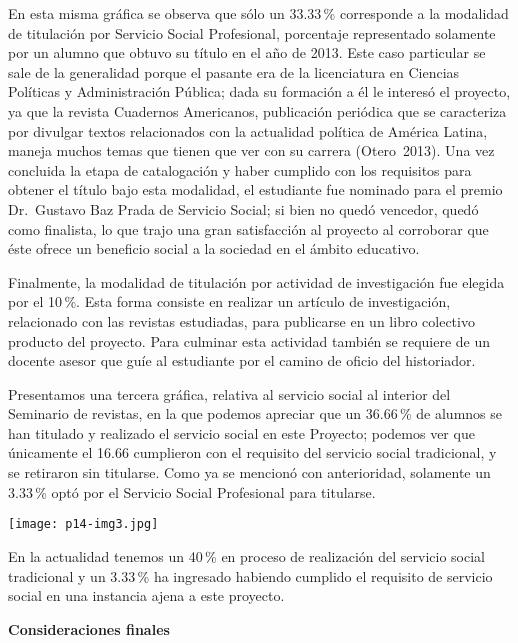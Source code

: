 En esta misma gráfica se observa que sólo un 33.33\,\% corresponde a la
modalidad de titulación por Servicio Social Profesional, porcentaje
representado solamente por un alumno que obtuvo su título en el año de
2013. Este caso particular se sale de la generalidad porque el pasante era
de la licenciatura en Ciencias Políticas y Administración Pública; dada su
formación a él le interesó el proyecto, ya que la revista Cuadernos
Americanos, publicación periódica que se caracteriza por divulgar textos
relacionados con la actualidad política de América Latina, maneja muchos
temas que tienen que ver con su carrera (Otero~2013). Una vez concluida
la etapa de catalogación y haber cumplido con los requisitos para obtener
el título bajo esta modalidad, el estudiante fue nominado para el premio
Dr.\ Gustavo Baz Prada de Servicio Social; si bien no quedó vencedor, quedó
como finalista, lo que trajo una gran satisfacción al proyecto al
corroborar  que éste ofrece un beneficio social a la sociedad en el ámbito
educativo.

Finalmente, la modalidad de titulación por actividad de investigación fue
elegida por el 10\,\%. Esta forma consiste en realizar un artículo de
investigación, relacionado con las revistas estudiadas, para publicarse en
un libro colectivo producto del proyecto. Para culminar esta actividad
también se requiere de un docente asesor que guíe al estudiante por el
camino de oficio del historiador.

Presentamos una tercera gráfica, relativa
al servicio social al interior del Seminario de revistas, en la que podemos
apreciar que un 36.66\,\% de alumnos se han titulado y realizado el servicio
social en este Proyecto; podemos ver que únicamente el 16.66 cumplieron con
el requisito del servicio social tradicional, y se retiraron sin titularse.
Como ya se mencionó con anterioridad, solamente un 3.33\,\% optó por el
Servicio Social Profesional para titularse.
 

\texttt{[image: p14-img3.jpg]} 

\medskip
En la actualidad tenemos un 40\,\% en proceso de realización del servicio
social tradicional y un 3.33\,\% ha ingresado habiendo cumplido el requisito
de servicio social en una instancia ajena a este proyecto.

\textbf{Consideraciones finales}

